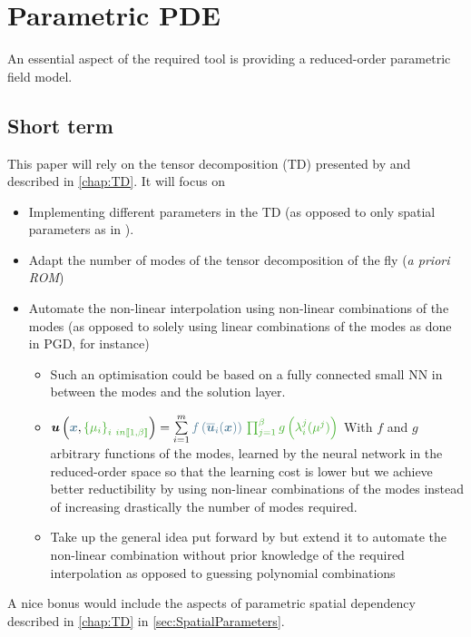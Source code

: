 \section{Parametric PDE}

An essential aspect of the required tool is providing a reduced-order parametric field model. 
\subsection{Short term}
This paper will rely on the tensor decomposition (TD) presented by \cite{zhang_hidenn-td_2022} and described in \cref{chap:TD}. It will focus on 
\begin{itemize}
    \item Implementing different parameters in the TD (as opposed to only spatial parameters as in \parencite{zhang_hidenn-td_2022}).
    \item Adapt the number of modes of the tensor decomposition of the fly (\emph{a priori ROM})
    \item Automate the non-linear interpolation using non-linear combinations of the modes (as opposed to solely using linear combinations of the modes as done in PGD, for instance)
    \begin{itemize}
        \item Such an optimisation could be based on a fully connected small NN in between the modes and the solution layer.
        \item $\vect{u}\left(\textcolor{BleuLMS!70}{\vect{x}}, \textcolor{LGreenLMS}{\left\{\mu_i\right\}_{i \ in \llbracket 1, \beta \rrbracket}}\right) = \sum\limits_{i=1}^m \textcolor{BleuLMS!70}{f\left(\overline{\vect{u}}_i(\vect{x})\right)} ~\textcolor{LGreenLMS}{\prod_{j=1}^{\beta}g\left(\lambda_i^j(\mu^j)\right)}$ 
        With $f$ and $g$ arbitrary functions of the modes, learned by the neural network in the reduced-order space so that the learning cost is lower but we achieve better reductibility by using non-linear combinations of the modes instead of increasing drastically the number of modes required.
        \item Take up the general idea put forward by \cite{kramer_learning_2024,geelen_learning_2024} but extend it to automate the non-linear combination  without prior knowledge of the required interpolation as opposed to guessing polynomial combinations
    \end{itemize}
\end{itemize}

A nice bonus would include the aspects of parametric spatial dependency described in \cref{chap:TD} in \cref{sec:SpatialParameters}.

